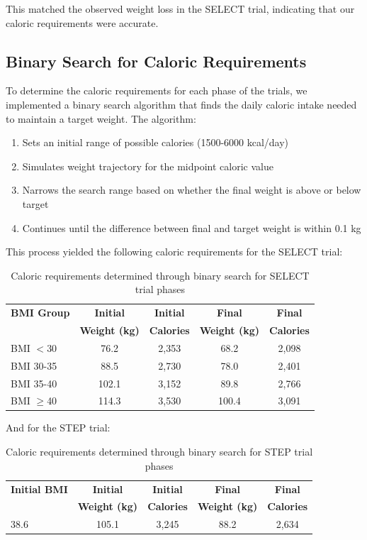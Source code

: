 This matched the observed weight loss in the SELECT trial, indicating that our caloric requirements were accurate.

\subsection{Binary Search for Caloric Requirements}
To determine the caloric requirements for each phase of the trials, we implemented a binary search algorithm that finds the daily caloric intake needed to maintain a target weight. The algorithm:

\begin{enumerate}
    \item Sets an initial range of possible calories (1500-6000 kcal/day)
    \item Simulates weight trajectory for the midpoint caloric value
    \item Narrows the search range based on whether the final weight is above or below target
    \item Continues until the difference between final and target weight is within 0.1 kg
\end{enumerate}

This process yielded the following caloric requirements for the SELECT trial:

\begin{table}[h]
\centering
\begin{tabular}{|l|c|c|c|c|}
\hline
\textbf{BMI Group} & \textbf{Initial} & \textbf{Initial} & \textbf{Final} & \textbf{Final} \\
& \textbf{Weight (kg)} & \textbf{Calories} & \textbf{Weight (kg)} & \textbf{Calories} \\
\hline
BMI $<$30 & 76.2 & 2,353 & 68.2 & 2,098 \\
BMI 30-35 & 88.5 & 2,730 & 78.0 & 2,401 \\
BMI 35-40 & 102.1 & 3,152 & 89.8 & 2,766 \\
BMI $\geq$40 & 114.3 & 3,530 & 100.4 & 3,091 \\
\hline
\end{tabular}
\caption{Caloric requirements determined through binary search for SELECT trial phases}
\end{table}

And for the STEP trial:

\begin{table}[h]
\centering
\begin{tabular}{|l|c|c|c|c|}
\hline
\textbf{Initial BMI} & \textbf{Initial} & \textbf{Initial} & \textbf{Final} & \textbf{Final} \\
& \textbf{Weight (kg)} & \textbf{Calories} & \textbf{Weight (kg)} & \textbf{Calories} \\
\hline
38.6 & 105.1 & 3,245 & 88.2 & 2,634 \\
\hline
\end{tabular}
\caption{Caloric requirements determined through binary search for STEP trial phases}
\end{table}

